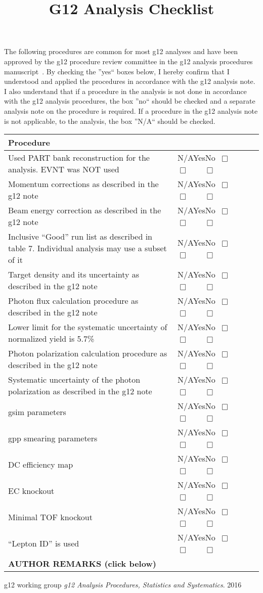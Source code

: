 \documentclass[11pt]{article} %
\title{G12 Analysis Checklist}
\date{\vspace{-10ex}}
\newcommand{\yesno}{\textsf{N/A}\hskip11pt\textsf{Yes}\hskip11pt\textsf{No}\hskip11pt{\Large ~$\Box$}~~~~ {\Large ~$\Box$}~~~~{\Large $\Box$}}
\newcommand{\question}[1]{

		\textsf{#1} &{\small\yesno} \\ \hline%
}
\newcommand{\heading}[1]{%
	\multicolumn{2}{l|}{\bf\textsf{#1}}\\ \hline %
}
\begin{document}
	\maketitle
	The following procedures are common for most g12 analyses and have been approved by the g12 procedure review committee in the g12 analysis procedures manuscript~\cite{g12note}.
	By checking the ''yes`` boxes below, I hereby confirm that I understood and applied the procedures in accordance with the g12 analysis note. I also understand that if a procedure in the analysis is not done in accordance with the g12 analysis procedures, the box ''no`` should be checked and a separate analysis note on the procedure is required. If a procedure in the g12 analysis note is not applicable, to the analysis, the box ''N/A`` should be checked. 
	
	\begin{longtable}{|p{6.61cm}|p{3.1cm}|}
		\heading{Procedure}
        \question{Used PART bank reconstruction for the analysis. EVNT was NOT used}
       \question{Momentum corrections as described in the g12 note}
		\question{Beam energy correction as described in the g12 note}
		\question{Inclusive “Good” run list as described in table 7. Individual analysis may use a subset of it}
		\question{Target density and its uncertainty as described in the g12 note}
		\question{Photon flux calculation procedure as described in the g12 note}
		\question{Lower limit for the systematic uncertainty of normalized yield is 5.7\%}
		\question{Photon polarization calculation procedure as described in the g12 note}
		\question{Systematic uncertainty of the photon polarization as described in the g12 note}
		\question{gsim parameters}
		\question{gpp smearing parameters}
		\question{DC efficiency map}
		\question{EC knockout}
		\question{Minimal TOF knockout}
		\question{“Lepton ID” is used}
		\hline%
		\multicolumn{2}{|l|}{\bf {\textsf{AUTHOR REMARKS}} (click below)}\\
	\end{longtable}
	\vspace{-0.75cm}
	\begin{Form}
		\begin{center}
		\centering
			\TextField[name=multilinetextbox, multiline=true, width=\longline,height=4in]{}
		\end{center}
	\end{Form}
		\vspace{0.75cm}
	
	\begin{thebibliography}{9}
		g12 working group
		\textit{g12 Analysis Procedures, Statistics and Systematics}.
		2016
	\end{thebibliography}
	
	
\end{document}
